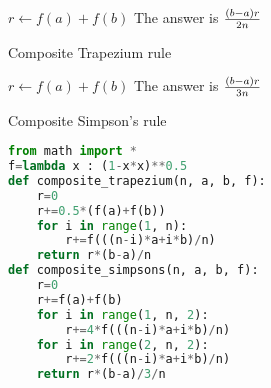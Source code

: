 \documentclass{article} %
\theoremstyle{break}
\begin{document}
\LinesNumbered
 \begin{algorithm}[H]
 $r\leftarrow f(a)+f(b)$\;  
 The answer is ${(b-a)r\over 2n}$\;
 \caption{Composite Trapezium rule}
\end{algorithm}


\LinesNumbered
 \begin{algorithm}[H]
 $r\leftarrow f(a)+f(b)$\;  
 The answer is ${(b-a)r\over 3n}$\;
 \caption{Composite Simpson's rule}
\end{algorithm}


 
\begin{lstlisting}[language=Python]
from math import *
f=lambda x : (1-x*x)**0.5
def composite_trapezium(n, a, b, f):
    r=0
    r+=0.5*(f(a)+f(b))
    for i in range(1, n):
        r+=f(((n-i)*a+i*b)/n)
    return r*(b-a)/n
def composite_simpsons(n, a, b, f):
    r=0
    r+=f(a)+f(b)
    for i in range(1, n, 2):
        r+=4*f(((n-i)*a+i*b)/n)
    for i in range(2, n, 2):
        r+=2*f(((n-i)*a+i*b)/n)
    return r*(b-a)/3/n
\end{lstlisting}
\end{document}
